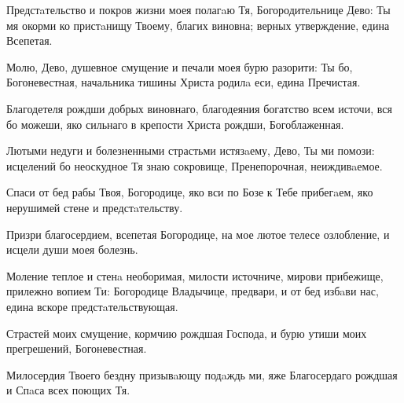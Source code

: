 \begin{mymulticols}



Предстaтельство и покров жизни моея полагaю Тя, Богородительнице Дево: Ты мя окорми ко пристaнищу Твоему, благих виновна; верных утверждение, едина Всепетая.


Молю, Дево, душевное смущение и печали моея бурю разорити: Ты бо, Богоневестная, начальника тишины Христа родилa еси, едина Пречистая.

\slava

Благодетеля рождши добрых виновнаго, благодеяния богатство всем источи, вся бо можеши, яко сильнаго в крепости Христа рождши, Богоблаженная.

\inyne

Лютыми недуги и болезненными страстьми истязaему, Дево, Ты ми помози: исцелений бо неоскудное Тя знаю сокровище, Пренепорочная, неиждивaемое.

Спаси от бед рабы Твоя, Богородице, яко вси по Бозе к Тебе прибегaем, яко нерушимей стене и предстaтельству.

Призри благосердием, всепетая Богородице, на мое лютое телесе озлобление, и исцели души моея болезнь.


Моление теплое и стенa необоримая, милости источниче, мирови прибежище, прилежно вопием Ти: Богородице Владычице, предвари, и от бед избaви нас, едина вскоре предстaтельствующая.




Страстей моих смущение, кормчию рождшая Господа, и бурю утиши моих прегрешений, Богоневестная.


Милосердия Твоего бездну призывaющу подaждь ми, яже Благосердаго рождшая и Спaса всех поющих Тя.



\end{mymulticols}
